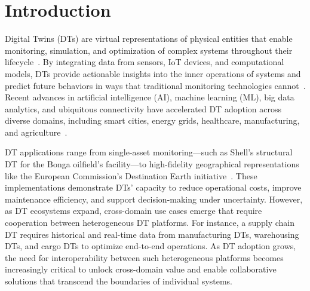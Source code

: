 
\chapter{Introduction}
\label{chap:introduction}


Digital Twins (DTs) are virtual representations of physical entities that enable monitoring, simulation, and optimization of complex systems throughout their lifecycle~\cite{Botín-Sanabria_2022}.
By integrating data from sensors, IoT devices, and computational models, DTs provide actionable insights into the inner operations of systems and predict future behaviors in ways that traditional monitoring technologies cannot~\cite{Botín-Sanabria_2022}.
Recent advances in artificial intelligence (AI), machine learning (ML), big data analytics, and ubiquitous connectivity have accelerated DT adoption across diverse domains, including smart cities, energy grids, healthcare, manufacturing, and agriculture~\cite{Kshetri_2021}.


DT applications range from single-asset monitoring---such as Shell's structural DT for the Bonga oilfield's facility---to high-fidelity geographical representations like the European Commission's Destination Earth initiative~\cite{Kshetri_2021}.
These implementations demonstrate DTs' capacity to reduce operational costs, improve maintenance efficiency, and support decision-making under uncertainty.
However, as DT ecosystems expand, cross-domain use cases emerge that require cooperation between heterogeneous DT platforms.
For instance, a supply chain DT \cite{Gerlach_Zarnitz_2021} requires historical and real-time data from manufacturing DTs, warehousing DTs, and cargo DTs to optimize end-to-end operations.
As DT adoption grows, the need for interoperability between such heterogeneous platforms becomes increasingly critical to unlock cross-domain value and enable collaborative solutions that transcend the boundaries of individual systems.


